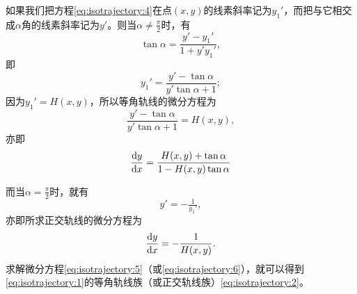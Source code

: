 如果我们把方程\eqref{eq:isotrajectory:4}在点$(x,y)$的线素斜率记为$y_1'$，而把与它相交成$\alpha$角的线素斜率记为$y'$。则当$\alpha\neq\tfrac{\pi}{2}$时，有
\[
\tan\alpha=\frac{y'-y_1'}{1+y'y_1'},
\]
即
\[
y_1'=\frac{y'-\tan\alpha}{y'\tan\alpha+1};
\]
因为$y_1'=H(x,y)$，所以等角轨线的微分方程为
\[
\frac{y'-\tan\alpha}{y'\tan\alpha+1}=H(x,y),
\]
亦即
\begin{equation}\label{eq:isotrajectory:5}
\frac{\mathrm{d}{}y}{\mathrm{d}{}x}=\frac{H(x,y)+\tan\alpha}{1-H(x,y)\tan\alpha}
\end{equation}

而当$\alpha=\tfrac{\pi}{2}$时，就有
\[
y'=-\tfrac{1}{y_1'},
\]
亦即所求正交轨线的微分方程为
\begin{equation}\label{eq:isotrajectory:6}
\frac{\mathrm{d}{}y}{\mathrm{d}{}x}=-\frac{1}{H(x,y)}.
\end{equation}
求解微分方程\eqref{eq:isotrajectory:5}（或\eqref{eq:isotrajectory:6}），就可以得到\eqref{eq:isotrajectory:1}的等角轨线族（或正交轨线族）\eqref{eq:isotrajectory:2}。
